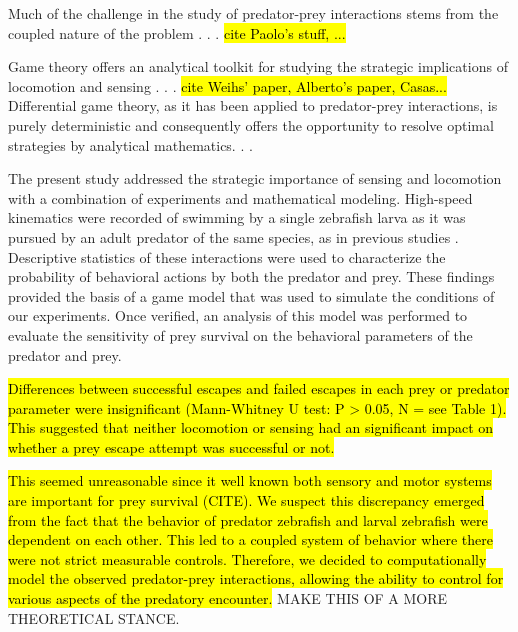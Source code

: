 \documentclass[]{rsos}%
\begin{document}
Much of the challenge in the study of predator-prey interactions stems from the coupled nature of the problem . . . \hl{cite Paolo's stuff, ...}

Game theory offers an analytical toolkit for studying the strategic implications of locomotion and sensing . . .
\hl{cite Weihs' paper, Alberto's paper, Casas...}
Differential game theory, as it has been applied to predator-prey interactions, is purely deterministic and consequently offers the opportunity to resolve optimal strategies by analytical mathematics. . .

The present study addressed the strategic importance of sensing and locomotion with a combination of experiments and mathematical modeling. 
High-speed kinematics were recorded of swimming by a single zebrafish larva as it was pursued by an adult predator of the same species, as in previous studies \cite{Stewart:2014cma, Soto:2015cj}.
Descriptive statistics of these interactions were used to characterize the probability of behavioral actions by both the predator and prey.
These findings provided the basis of a game model that was used to simulate the conditions of our experiments. 
Once verified, an analysis of this model was performed to evaluate the sensitivity of prey survival on the behavioral parameters of the predator and prey.


\hl{Differences between successful escapes and failed escapes in each prey or predator parameter were insignificant (Mann-Whitney U test: P > 0.05, N = see Table 1).
This suggested that neither locomotion or sensing had an significant impact on whether a prey escape attempt was successful or not.}

\hl{This seemed unreasonable since it well known both sensory and motor systems are important for prey survival (CITE). We suspect this discrepancy emerged from the fact that the behavior of predator zebrafish and larval zebrafish were dependent on each other. This led to a coupled system of behavior where there were not strict measurable controls. Therefore, we decided to computationally model the observed predator-prey interactions, allowing the ability to control for various aspects of the predatory encounter.}
MAKE THIS OF A MORE THEORETICAL STANCE.
\end{document}

